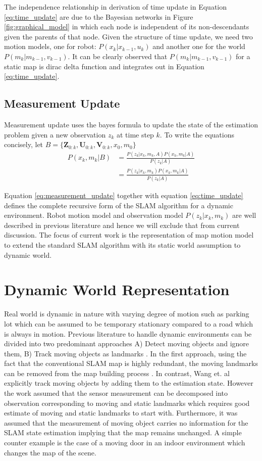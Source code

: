 \documentclass[10pt,twocolumn,letterpaper]{article}
\begin{document}
The independence relationship in derivation of time update in Equation \ref{eq:time_update} are due to the Bayesian networks in Figure \ref{fig:graphical_model} in which each node is independent of its non-descendants given the parents of that node. Given the structure of time update, we need two motion models, one for robot: $P(x_k|x_{k-1},u_k)$ and another one for the world $P(m_k|m_{k-1},v_{k-1})$. It can be clearly observed that $P(m_k|m_{k-1},v_{k-1})$ for a static map is dirac delta function and integrates out in Equation \ref{eq:time_update}. 

\subsection{Measurement Update} Measurement update uses the bayes formula to update the state of the estimation problem given a new observation $z_k$ at time step $k$. To write the equations concisely, let $B =\{ \mathbf{Z}_{0:k},\mathbf{U}_{0:k},\mathbf{V}_{0:k},x_0,m_0 \}$
 \begin{align}
P(x_k,m_k|B) &= \frac{P(z_k|x_k,m_k,A)P(x_k,m_k|A)}{P(z_k|A)} \nonumber\\
&=\frac{P(z_k|x_k,m_k)P(x_k,m_k|A)}{P(z_k|A)}
\label{eq:measurement_update}
\end{align}

Equation \ref{eq:measurement_update} together with equation \ref{eq:time_update} defines the complete recursive form of the SLAM algorithm for a dynamic environment. Robot motion model and observation model $P(z_k|x_k,m_k)$ are well described in previous literature and hence we will exclude that from current discussion. The focus of current work is the representation of map motion model to extend the standard SLAM algorithm with its static world assumption to dynamic world.

\section{Dynamic World Representation} Real world is dynamic in nature with varying degree of motion such as parking lot which can be assumed to be temporary stationary compared to a road which is always in motion. Previous literature to handle dynamic environments can be divided into two predominant approaches A) Detect moving objects and ignore them, B) Track moving objects as landmarks  \cite{bailey2006simultaneous}. In the first approach, using the fact that the conventional SLAM map is highly redundant, the moving landmarks can be removed from the map building process \cite{bailey2002mobile}. In contrast, Wang et. al \cite{wang2003online} explicitly track moving objects by adding them to the estimation state. However the work assumed that the sensor measurement can be decomposed into observation corresponding to moving and static landmarks which requires good estimate of moving and static landmarks to start with. Furthermore, it was assumed that the measurement of moving object carries no information for the SLAM state estimation implying that the map remains unchanged. A simple counter example is the case of a moving door in an indoor environment which changes the map of the scene.
\end{document}
